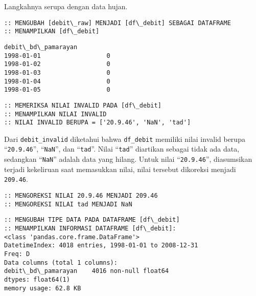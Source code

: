 \documentclass[11pt]{article}
\makeatletter
\newcommand{\boxspacing}{\kern\kvtcb@left@rule\kern\kvtcb@boxsep}
\newcommand{\prompt}[4]{
        \ttfamily\llap{{\color{#2}[#3]:\hspace{3pt}#4}}\vspace{-\baselineskip}
    }
\makeatother
\begin{document}
Langkahnya serupa dengan data hujan.

    \begin{Verbatim}[commandchars=\\\{\}]
:: MENGUBAH [debit\_raw] MENJADI [df\_debit] SEBAGAI DATAFRAME
:: MENAMPILKAN [df\_debit]
    \end{Verbatim}

            \begin{tcolorbox}[breakable, size=fbox, boxrule=.5pt, pad at break*=1mm, opacityfill=0]
\prompt{Out}{outcolor}{20}{\boxspacing}
\begin{Verbatim}[commandchars=\\\{\}]
           debit\_bd\_pamarayan
1998-01-01                  0
1998-01-02                  0
1998-01-03                  0
1998-01-04                  0
1998-01-05                  0
\end{Verbatim}
\end{tcolorbox}
        
    \begin{Verbatim}[commandchars=\\\{\}]
:: MEMERIKSA NILAI INVALID PADA [df\_debit]
:: MENAMPILKAN NILAI INVALID
:: NILAI INVALID BERUPA = ['20.9.46', 'NaN', 'tad']
    \end{Verbatim}

    Dari \texttt{debit\_invalid} diketahui bahwa \texttt{df\_debit} memiliki
nilai invalid berupa ``\texttt{20.9.46}'', ``\texttt{NaN}'', dan
``\texttt{tad}''. Nilai ``\texttt{tad}'' diartikan sebagai tidak ada
data, sedangkan ``\texttt{NaN}'' adalah data yang hilang. Untuk nilai
``\texttt{20.9.46}'', diasumsikan terjadi kekeliruan saat memasukkan
nilai, nilai tersebut dikoreksi menjadi \texttt{209.46}.

    \begin{Verbatim}[commandchars=\\\{\}]
:: MENGOREKSI NILAI 20.9.46 MENJADI 209.46
:: MENGOREKSI NILAI tad MENJADI NaN
    \end{Verbatim}

    \begin{Verbatim}[commandchars=\\\{\}]
:: MENGUBAH TIPE DATA PADA DATAFRAME [df\_debit]
:: MENAMPILKAN INFORMASI DATAFRAME [df\_debit]:
<class 'pandas.core.frame.DataFrame'>
DatetimeIndex: 4018 entries, 1998-01-01 to 2008-12-31
Freq: D
Data columns (total 1 columns):
debit\_bd\_pamarayan    4016 non-null float64
dtypes: float64(1)
memory usage: 62.8 KB
    \end{Verbatim}
\end{document}
